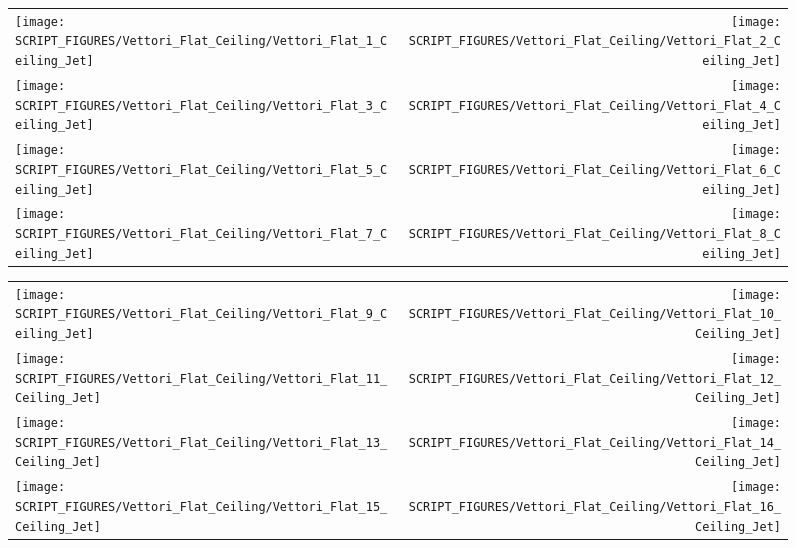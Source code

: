 \begin{figure}[p]
\begin{tabular*}{\textwidth}{l@{\extracolsep{\fill}}r}
\texttt{[image: SCRIPT\_FIGURES/Vettori\_Flat\_Ceiling/Vettori\_Flat\_1\_Ceiling\_Jet]} &
\texttt{[image: SCRIPT\_FIGURES/Vettori\_Flat\_Ceiling/Vettori\_Flat\_2\_Ceiling\_Jet]} \\
\texttt{[image: SCRIPT\_FIGURES/Vettori\_Flat\_Ceiling/Vettori\_Flat\_3\_Ceiling\_Jet]} &
\texttt{[image: SCRIPT\_FIGURES/Vettori\_Flat\_Ceiling/Vettori\_Flat\_4\_Ceiling\_Jet]} \\
\texttt{[image: SCRIPT\_FIGURES/Vettori\_Flat\_Ceiling/Vettori\_Flat\_5\_Ceiling\_Jet]} &
\texttt{[image: SCRIPT\_FIGURES/Vettori\_Flat\_Ceiling/Vettori\_Flat\_6\_Ceiling\_Jet]} \\
\texttt{[image: SCRIPT\_FIGURES/Vettori\_Flat\_Ceiling/Vettori\_Flat\_7\_Ceiling\_Jet]} &
\texttt{[image: SCRIPT\_FIGURES/Vettori\_Flat\_Ceiling/Vettori\_Flat\_8\_Ceiling\_Jet]}
\end{tabular*}
\end{figure}

\begin{figure}[p]
\begin{tabular*}{\textwidth}{l@{\extracolsep{\fill}}r}
\texttt{[image: SCRIPT\_FIGURES/Vettori\_Flat\_Ceiling/Vettori\_Flat\_9\_Ceiling\_Jet]} &
\texttt{[image: SCRIPT\_FIGURES/Vettori\_Flat\_Ceiling/Vettori\_Flat\_10\_Ceiling\_Jet]} \\
\texttt{[image: SCRIPT\_FIGURES/Vettori\_Flat\_Ceiling/Vettori\_Flat\_11\_Ceiling\_Jet]} &
\texttt{[image: SCRIPT\_FIGURES/Vettori\_Flat\_Ceiling/Vettori\_Flat\_12\_Ceiling\_Jet]} \\
\texttt{[image: SCRIPT\_FIGURES/Vettori\_Flat\_Ceiling/Vettori\_Flat\_13\_Ceiling\_Jet]} &
\texttt{[image: SCRIPT\_FIGURES/Vettori\_Flat\_Ceiling/Vettori\_Flat\_14\_Ceiling\_Jet]} \\
\texttt{[image: SCRIPT\_FIGURES/Vettori\_Flat\_Ceiling/Vettori\_Flat\_15\_Ceiling\_Jet]} &
\texttt{[image: SCRIPT\_FIGURES/Vettori\_Flat\_Ceiling/Vettori\_Flat\_16\_Ceiling\_Jet]}
\end{tabular*}
\end{figure}

